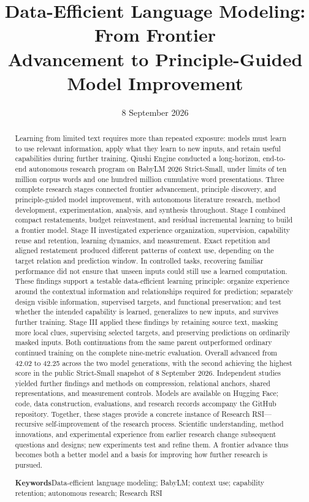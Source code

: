 \documentclass[11pt,a4paper]{article}
\title{Data-Efficient Language Modeling: From Frontier\\
Advancement to Principle-Guided Model Improvement}
\date{8 September 2026}
\begin{document}
\maketitle
\thispagestyle{plain}
\begin{abstract}
Learning from limited text requires more than repeated exposure: models must learn to use relevant information, apply what they learn to new inputs, and retain useful capabilities during further training. Qiushi Engine conducted a long-horizon, end-to-end autonomous research program on BabyLM 2026 Strict-Small, under limits of ten million corpus words and one hundred million cumulative word presentations. Three complete research stages connected frontier advancement, principle discovery, and principle-guided model improvement, with autonomous literature research, method development, experimentation, analysis, and synthesis throughout. Stage I combined compact restatements, budget reinvestment, and residual incremental learning to build a frontier model. Stage II investigated experience organization, supervision, capability reuse and retention, learning dynamics, and measurement. Exact repetition and aligned restatement produced different patterns of context use, depending on the target relation and prediction window. In controlled tasks, recovering familiar performance did not ensure that unseen inputs could still use a learned computation. These findings support a testable data-efficient learning principle: organize experience around the contextual information and relationships required for prediction; separately design visible information, supervised targets, and functional preservation; and test whether the intended capability is learned, generalizes to new inputs, and survives further training. Stage III applied these findings by retaining source text, masking more local clues, supervising selected targets, and preserving predictions on ordinarily masked inputs. Both continuations from the same parent outperformed ordinary continued training on the complete nine-metric evaluation. Overall advanced from 42.02 to 42.25 across the two model generations, with the second achieving the highest score in the public Strict-Small snapshot of 8 September 2026. Independent studies yielded further findings and methods on compression, relational anchors, shared representations, and measurement controls. Models are available on Hugging Face; code, data construction, evaluations, and research records accompany the GitHub repository. Together, these stages provide a concrete instance of Research RSI---recursive self-improvement of the research process. Scientific understanding, method innovations, and experimental experience from earlier research change subsequent questions and designs; new experiments test and refine them. A frontier advance thus becomes both a better model and a basis for improving how further research is pursued.
\par\smallskip\noindent\textbf{Keywords}\quad Data-efficient language modeling; BabyLM; context use; capability retention; autonomous research; Research RSI
\end{abstract}
\end{document}
